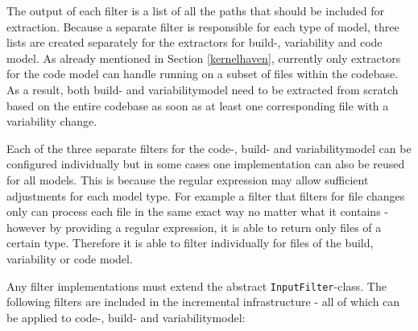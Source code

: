 \documentclass[a4paper]{article}
\begin{document}
The output of each filter is a list of all the paths that should be included for extraction. Because a separate filter is responsible for each type of model, three lists are created separately for the extractors for build-, variability and code model. As already mentioned in Section \ref{kernelhaven}, currently only extractors for the code model can handle running on a subset of files within the codebase. As a result, both build- and variabilitymodel need to be extracted from scratch based on the entire codebase as soon as at least one corresponding file with a variability change.

Each of the three separate filters for the code-, build- and variabilitymodel can be configured individually but in some cases one implementation can also be reused for all models. This is because the regular expression may allow sufficient adjustments for each model type. For example a filter that filters for file changes only can process each file in the same exact way no matter what it contains - however by providing a regular expression, it is able to return only files of a certain type. Therefore it is able to filter individually for files of the build, variability or code model.

 Any filter implementations must extend the abstract \texttt{InputFilter}-class. The following filters are included in the incremental infrastructure - all of which can be applied to code-, build- and variabilitymodel:
\end{document}
